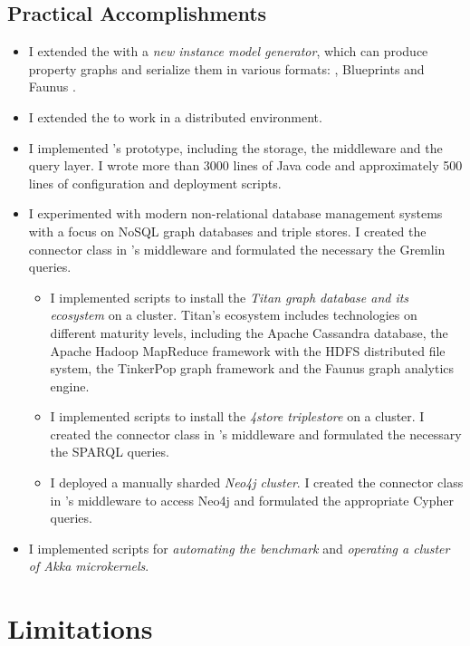 \subsection{Practical Accomplishments}

\begin{itemize}
  \item I extended the \tb{} with a \emph{new instance model generator}, which can produce property graphs and serialize them in various formats: \graphml{}, Blueprints \graphson{} and Faunus \graphson{}. %
  \item I extended the \tb{} to work in a distributed environment. 
  \item I implemented \iqd{}'s prototype, including the storage, the middleware and the query layer. I wrote more than 3000 lines of Java code and approximately 500 lines of configuration and deployment scripts.
  \item I experimented with modern non-relational database management systems with a focus on NoSQL graph databases and triple stores. I created the connector class in \iqd{}'s middleware and formulated the necessary the Gremlin queries.
  \begin{itemize}
    \item I implemented scripts to install the \emph{Titan graph database and its ecosystem} on a cluster. Titan's ecosystem includes technologies on different maturity levels, including the Apache Cassandra database, the Apache Hadoop MapReduce framework with the HDFS distributed file system, the TinkerPop graph framework and the Faunus graph analytics engine.
    \item I implemented scripts to install the \emph{4store triplestore} on a cluster. I created the connector class in \iqd{}'s middleware and formulated the necessary the SPARQL queries. 
    \item I deployed a manually sharded \emph{Neo4j cluster}. I created the connector class in \iqd{}'s middleware to access Neo4j and formulated the appropriate Cypher queries.
  \end{itemize}
  \item I implemented scripts for \emph{automating the benchmark} and \emph{operating a cluster of Akka microkernels}.
\end{itemize}

\section{Limitations}


